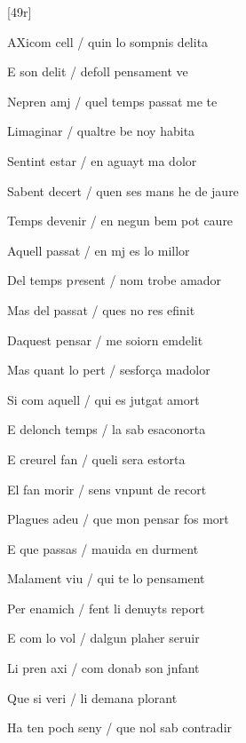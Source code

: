 




[49r] 
\begin{estrofa}

 AXicom cell / quin lo sompnis delita

 E son delit / defoll pensament ve

 Nepren amj / quel temps passat me te

 Limaginar / qualtre be noy habita

 Sentint estar / en aguayt ma dolor

 Sabent decert / quen ses mans he de jaure

 Temps devenir / en negun bem pot caure

 Aquell passat / en mj es lo millor

\end{estrofa}



\begin{estrofa}

 Del temps p\textit{re}sent / nom trobe amador

 Mas del passat / ques no res efinit

 Daquest pensar / me soiorn emdelit

 Mas quant lo pert / sesfor\c{c}a madolor

 Si com aquell / qui es jutgat amort

 E delonch temps / la sab esaconorta

 E creurel fan / queli sera estorta

 El fan morir / sens vnpunt de recort

\end{estrofa}



\begin{estrofa}

 Plagues adeu / que mon pensar fos mort

 E que passas / mauida en durment

 Malament viu / qui te lo pensament

 Per enamich / fent li denuyts report

 E com lo vol / dalgun plaher seruir

 Li pren axi / com donab son jnfant

 Que si veri / li demana plorant

 Ha ten poch seny / que nol sab contradir

\end{estrofa}



